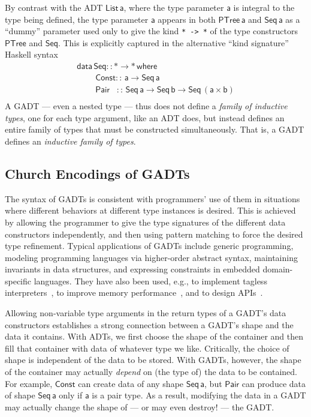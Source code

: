 \documentclass[acmsmall,screen,review,anonymous]{acmart}
\theoremstyle{definition}
\begin{document}
By contrast with the ADT $\mathsf{List\, a}$, where the type parameter
$\mathsf{a}$ is integral to the type being defined, the type parameter
$\mathsf{a}$ appears in both $\mathsf{PTree\,a}$ and $\mathsf{Seq\,a}$
as a ``dummy'' parameter used only to give the kind \verb|* -> *| of
the type constructors $\mathsf{PTree}$ and $\mathsf{Seq}$. This is
explicitly captured in the alternative ``kind signature'' Haskell
syntax
\[\begin{array}{l}
\mathsf{data\, Seq :: * \to *\,where}\\
\mathsf{\;\;\;\;\;\;\;\;Const ::\, a \to Seq\,a}\\
\mathsf{\;\;\;\;\;\;\;\;Pair\,\,\,\,\, ::\, Seq \,a \to Seq\,b \to
  Seq\,(a \times b)}\\ 
\end{array}\]
A GADT --- even a nested type --- thus does not define a {\em family
  of inductive types}, one for each type argument, like an ADT does,
but instead defines an entire family of types that must be constructed
simultaneously. That is, a GADT defines an {\em inductive family of
  types}.

\subsection{Church Encodings of GADTs}\label{sec:CEs}

The syntax of GADTs is consistent with programmers' use of them in
situations where different behaviors at different type instances is
desired. This is achieved by allowing the programmer to give the type
signatures of the different data constructors independently, and then
using pattern matching to force the desired type refinement.  Typical
applications of GADTs include generic programming, modeling
programming languages via higher-order abstract syntax, maintaining
invariants in data structures, and expressing constraints in embedded
domain-specific languages. They have also been used, e.g., to
implement tagless interpreters~\cite{pl04,pr06,pvww06}, to improve
memory performance~\cite{min15}, and to design APIs~\cite{pen20}.

Allowing non-variable type arguments in the return types of a GADT's
data constructors establishes a strong connection between a GADT's
shape and the data it contains. With ADTs, we first choose the shape
of the container and then fill that container with data of whatever
type we like. Critically, the choice of shape is independent of the
data to be stored. With GADTs, however, the shape of the container may
actually {\em depend} on (the type of) the data to be contained. For
example, $\mathsf{Const}$ can create data of any shape
$\mathsf{Seq\,a}$, but $\mathsf{Pair}$ can produce data of shape
$\mathsf{Seq\,a}$ only if $\mathsf{a}$ is a pair type. As a result,
modifying the data in a GADT may actually change the shape of --- or
may even destroy! --- the GADT.
\end{document}
